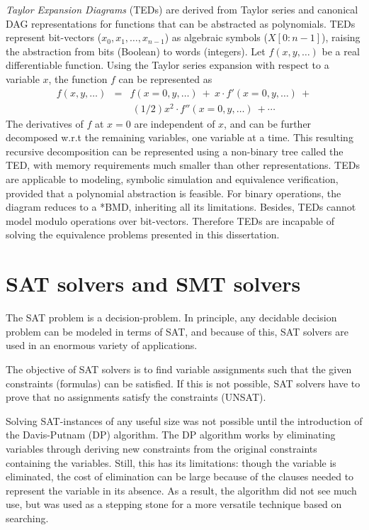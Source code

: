 
{\it Taylor Expansion Diagrams} (TEDs) \cite{ted_date}
\cite{ted_hldvt} \cite{ted_hldvt02} \cite{ted:priyank_thesis} are derived from Taylor series
and canonical DAG representations for functions that can be abstracted as
polynomials. TEDs represent bit-vectors ($x_0, x_1, \ldots, x_{n-1}$)
as algebraic symbols ($X [0:n-1]$), raising the abstraction from bits
(Boolean) to words (integers). Let $f(x, y, \ldots)$ be a real
differentiable function. Using the Taylor series expansion with
respect to a variable $x$, the function $f$ can be represented as
\begin{eqnarray}
f(x,y, \ldots) &=& f(x=0, y, \ldots) ~+ ~x\cdot f'(x=0, y, \ldots) ~+ \nonumber \\
               & & ~(1/2)x^2 \cdot f''(x=0,y,\ldots) ~+ \cdots 
\end{eqnarray} 
The derivatives of $f$ at $x=0$ are independent of $x$, and can be further
decomposed w.r.t the remaining variables, one variable at a time. This resulting
recursive decomposition can be represented using a non-binary tree called the
TED, with memory requirements much smaller than other representations. TEDs are
applicable to modeling, symbolic simulation and equivalence verification,
provided that a polynomial abstraction is feasible. For binary operations, the
diagram reduces to a *BMD, inheriting all its limitations. Besides, TEDs cannot model
modulo operations over bit-vectors. Therefore TEDs are incapable of solving the
equivalence problems presented in this dissertation. 


\section{SAT solvers and SMT solvers}
The SAT problem is a decision-problem. 
In principle, any decidable decision problem 
can be modeled in terms of SAT, and because of this, SAT solvers are used  
in an enormous variety of applications. 

The objective of SAT solvers is to find variable assignments such that the given constraints (formulas) can be satisfied.  
If this is not possible, SAT solvers have to prove that no assignments satisfy the constraints (UNSAT).  

Solving SAT-instances of any useful size was not possible until the introduction of the Davis-Putnam  (DP) \cite{davis_putnam:60} algorithm.  
The DP algorithm works by eliminating variables through deriving new constraints from the original constraints containing the variables. 
Still, this has its limitations: though the variable is eliminated, the cost of elimination can be large because of the 
clauses needed to represent the variable in its absence.  As a result, the algorithm did not see much use, 
but was used as a stepping stone for a more versatile technique based on searching.

